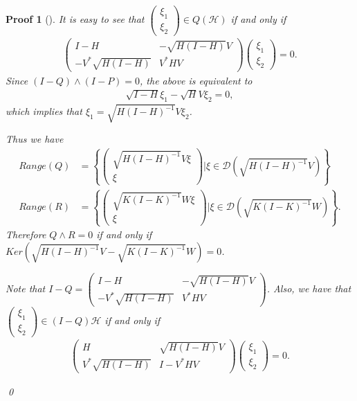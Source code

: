 \documentclass{jaums}
\theoremstyle{thmit} %
\theoremstyle{thmrm} %
\newtheorem*{oldproof}{Proof}
\renewenvironment{proof}[1][{}]{\begin{oldproof}[#1]}{\qed\end{oldproof}}
\begin{document}
\begin{proof} It is easy to see that
$\begin{pmatrix}
\xi_1 \\ \xi_2
\end{pmatrix} \in Q(\mathcal{H})$ if and only if
\begin{align*}
\begin{pmatrix}
I-H & -\sqrt{H(I-H)}V \\
-V^{*}\sqrt{H(I-H)} & V^{*}HV
\end{pmatrix}
\begin{pmatrix}
\xi_1 \\ \xi_2
\end{pmatrix} = 0.
\end{align*}
Since $(I-Q) \wedge (I-P) = 0$, the above is equivalent to
\begin{align*}
\sqrt{I-H}\xi_1 - \sqrt{H}V \xi_2 = 0,
\end{align*}
which implies that $\xi_1 = \sqrt{H(I-H)^{-1}}V\xi_2$.


Thus we have
\begin{align*}
Range(Q) &= \left\{
\begin{pmatrix}
\sqrt{H(I-H)^{-1}}V\xi \\
\xi
\end{pmatrix} | \xi \in \mathcal{D}(\sqrt{H(I-H)^{-1}}V) \right\} \\
Range(R) &= \left\{
\begin{pmatrix}
\sqrt{K(I-K)^{-1}}W\xi \\
\xi
\end{pmatrix} | \xi \in \mathcal{D}(\sqrt{K(I-K)^{-1}}W) \right\}.
\end{align*}
Therefore $Q \wedge R = 0$ if and only if $Ker(\sqrt{H(I-H)^{-1}}V -
\sqrt{K(I-K)^{-1}}W)
= 0 $.

Note that $I-Q = \begin{pmatrix}
I - H & -\sqrt{H(I-H)}V \\
-V^{*}\sqrt{H(I-H)} & V^{*}HV
\end{pmatrix}$. Also, we have that
$\begin{pmatrix}
\xi_1 \\ \xi_2
\end{pmatrix} \in (I-Q)\mathcal{H}$ if and only if
\begin{align*}
\begin{pmatrix}
H & \sqrt{H(I-H)}V \\
V^{*}\sqrt{H(I-H)} & I - V^{*}HV
\end{pmatrix}
\begin{pmatrix}
\xi_1 \\ \xi_2
\end{pmatrix} = 0.
\end{align*}


\end{proof}
\end{document}
